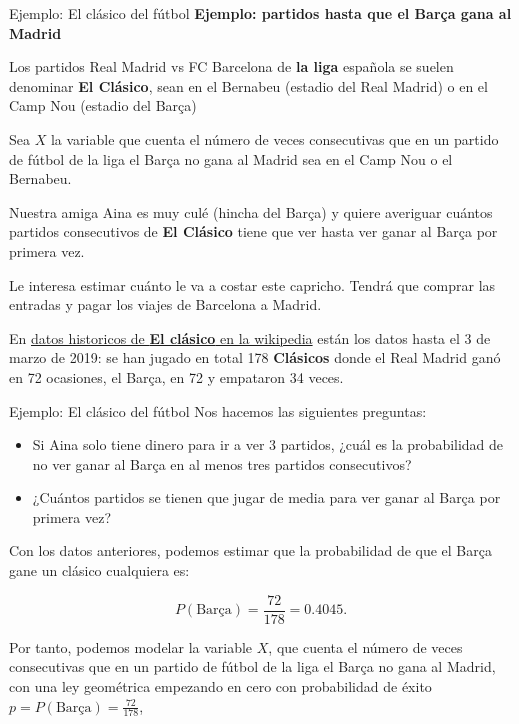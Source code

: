 \documentclass[
  ignorenonframetext,
  aspectratio=169]{beamer}
\providecommand{\tightlist}{%
  \setlength{\itemsep}{0pt}\setlength{\parskip}{0pt}}\usepackage{longtable,booktabs,array}
\begin{document}
\begin{frame}{Ejemplo: El clásico del fútbol}
\protect\hypertarget{ejemplo-el-cluxe1sico-del-fuxfatbol}{}
\textbf{Ejemplo: partidos hasta que el Barça gana al Madrid}

Los partidos Real Madrid vs FC Barcelona de \textbf{la liga} española se
suelen denominar \textbf{El Clásico}, sean en el Bernabeu (estadio del
Real Madrid) o en el Camp Nou (estadio del Barça)

Sea \(X\) la variable que cuenta el número de veces consecutivas que en
un partido de fútbol de la liga el Barça no gana al Madrid sea en el
Camp Nou o el Bernabeu.

Nuestra amiga Aina es muy culé (hincha del Barça) y quiere averiguar
cuántos partidos consecutivos de \textbf{El Clásico} tiene que ver hasta
ver ganar al Barça por primera vez.

Le interesa estimar cuánto le va a costar este capricho. Tendrá que
comprar las entradas y pagar los viajes de Barcelona a Madrid.

En \href{https://es.wikipedia.org/wiki/El_Cl\%C3\%A1sico}{datos
historicos de \textbf{El clásico} en la wikipedia} están los datos hasta
el 3 de marzo de 2019: se han jugado en total 178 \textbf{Clásicos}
donde el Real Madrid ganó en 72 ocasiones, el Barça, en 72 y empataron
34 veces.
\end{frame}

\begin{frame}{Ejemplo: El clásico del fútbol}
\protect\hypertarget{ejemplo-el-cluxe1sico-del-fuxfatbol-1}{}
Nos hacemos las siguientes preguntas:

\begin{itemize}
\tightlist
\item
  Si Aina solo tiene dinero para ir a ver 3 partidos, ¿cuál es la
  probabilidad de no ver ganar al Barça en al menos tres partidos
  consecutivos?
\item
  ¿Cuántos partidos se tienen que jugar de media para ver ganar al Barça
  por primera vez?
\end{itemize}

Con los datos anteriores, podemos estimar que la probabilidad de que el
Barça gane un clásico cualquiera es:

\[P(\mbox{Barça})=\frac{72}{178}=0.4045.\]

Por tanto, podemos modelar la variable \(X\), que cuenta el número de
veces consecutivas que en un partido de fútbol de la liga el Barça no
gana al Madrid, con una ley geométrica empezando en cero con
probabilidad de éxito \(p=P(\mbox{Barça})=\frac{72}{178}\),
\end{frame}
\end{document}
